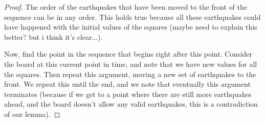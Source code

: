 \documentclass[11pt]{article}
\begin{document}
\begin{proof}
The order of the earthquakes that have been moved to the front of the sequence can be in any order. This holds true because all these earthquakes could have happened with the initial values of the squares (maybe need to explain this better? but i think it's clear...).

Now, find the point in the sequence that begins right after this point. Consider the board at this current point in time, and note that we have new values for all the squares. Then repeat this argument, moving a new set of earthquakes to the front. We repeat this until the end, and we note that eventually this argument terminates (because if we get to a point where there are still more earthquakes ahead, and the board doesn't allow any valid earthquakes, this is a contradiction of our lemma).





\end{proof}
\end{document}
